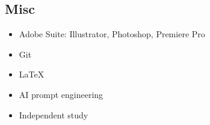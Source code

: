 \documentclass{res} %
\begin{document}
\begin{resume}
\subsection*{Misc}
\begin{itemize}
    \item Adobe Suite: Illustrator, Photoshop, Premiere Pro
    \item Git
    \item LaTeX
    \item AI prompt engineering
    \item Independent study
\end{itemize}




\vspace{0.2in} %

\vspace{0.2in} %







\end{resume} 
\end{document}
